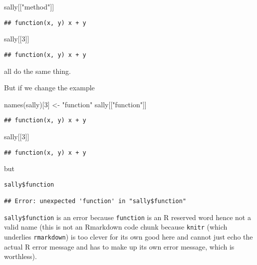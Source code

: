 \documentclass[
]{article}
\newenvironment{Shaded}{\begin{snugshade}}{\end{snugshade}}
\newcommand{\DecValTok}[1]{\textcolor[rgb]{0.00,0.00,0.81}{#1}}
\newcommand{\FunctionTok}[1]{\textcolor[rgb]{0.00,0.00,0.00}{#1}}
\newcommand{\NormalTok}[1]{#1}
\newcommand{\OtherTok}[1]{\textcolor[rgb]{0.56,0.35,0.01}{#1}}
\newcommand{\StringTok}[1]{\textcolor[rgb]{0.31,0.60,0.02}{#1}}
\begin{document}
\begin{Shaded}
\begin{Highlighting}[]
\NormalTok{sally[[}\StringTok{"method"}\NormalTok{]]}
\end{Highlighting}
\end{Shaded}

\begin{verbatim}
## function(x, y) x + y
\end{verbatim}

\begin{Shaded}
\begin{Highlighting}[]
\NormalTok{sally[[}\DecValTok{3}\NormalTok{]]}
\end{Highlighting}
\end{Shaded}

\begin{verbatim}
## function(x, y) x + y
\end{verbatim}

all do the same thing.

But if we change the example

\begin{Shaded}
\begin{Highlighting}[]
\FunctionTok{names}\NormalTok{(sally)[}\DecValTok{3}\NormalTok{] }\OtherTok{\textless{}{-}} \StringTok{"function"}
\NormalTok{sally[[}\StringTok{"function"}\NormalTok{]]}
\end{Highlighting}
\end{Shaded}

\begin{verbatim}
## function(x, y) x + y
\end{verbatim}

\begin{Shaded}
\begin{Highlighting}[]
\NormalTok{sally[[}\DecValTok{3}\NormalTok{]]}
\end{Highlighting}
\end{Shaded}

\begin{verbatim}
## function(x, y) x + y
\end{verbatim}

but

\begin{verbatim}
sally$function

## Error: unexpected 'function' in "sally$function"
\end{verbatim}

\texttt{sally\$function} is an error because \texttt{function} is an R
reserved word hence not a valid name (this is not an Rmarkdown code
chunk because \texttt{knitr} (which underlies \texttt{rmarkdown}) is too
clever for its own good here and cannot just echo the actual R error
message and has to make up its own error message, which is worthless).
\end{document}
